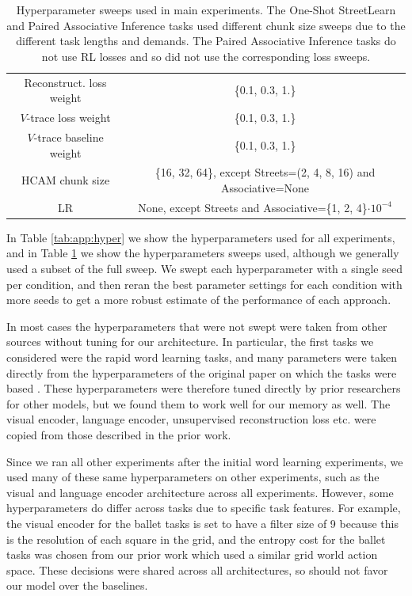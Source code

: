 \begin{table}[H]
    \centering
    \caption{Hyperparameter sweeps used in main experiments. The One-Shot StreetLearn and Paired Associative Inference tasks used different chunk size sweeps due to the different task lengths and demands. The Paired Associative Inference tasks do not use RL losses and so did not use the corresponding loss sweeps.} \label{tab:app:hypersweep}
    \begin{tabular}{|c|c|}
      \hline
      Reconstruct. loss weight & \{0.1, 0.3, 1.\}\\
      \(V\)-trace loss weight &  \{0.1, 0.3, 1.\}\\
      \(V\)-trace baseline weight &   \{0.1, 0.3, 1.\}\\
      HCAM chunk size & \{16, 32, 64\}, except Streets=(2, 4, 8, 16) and Associative=None\\
      LR & None, except Streets and Associative=\{1, 2, 4\}\(\cdot 10^{-4}\)\\
      \hline
    \end{tabular}
\end{table}
In Table \ref{tab:app:hyper} we show the hyperparameters used for all experiments, and in Table \ref{tab:app:hypersweep} we show the hyperparameters sweeps used, although we generally used a subset of the full sweep. We swept each hyperparameter with a single seed per condition, and then reran the best parameter settings for each condition with more seeds to get a more robust estimate of the performance of each approach.

In most cases the hyperparameters that were not swept were taken from other sources without tuning for our architecture. In particular, the first tasks we considered were the rapid word learning tasks, and many parameters were taken directly from the hyperparameters of the original paper on which the tasks were based \citep{hill2020grounded}. These hyperparameters were therefore tuned directly by prior researchers for other models, but we found them to work well for our memory as well. The visual encoder, language encoder, unsupervised reconstruction loss etc. were copied from those described in the prior work.

Since we ran all other experiments after the initial word learning experiments, we used many of these same hyperparameters on other experiments, such as the visual and language encoder architecture across all experiments. However, some hyperparameters do differ across tasks due to specific task features. For example, the visual encoder for the ballet tasks is set to have a filter size of 9 because this is the resolution of each square in the grid, and the entropy cost for the ballet tasks was chosen from our prior work \citep{hill2019environmental} which used a similar grid world action space. These decisions were shared across all architectures, so should not favor our model over the baselines.

